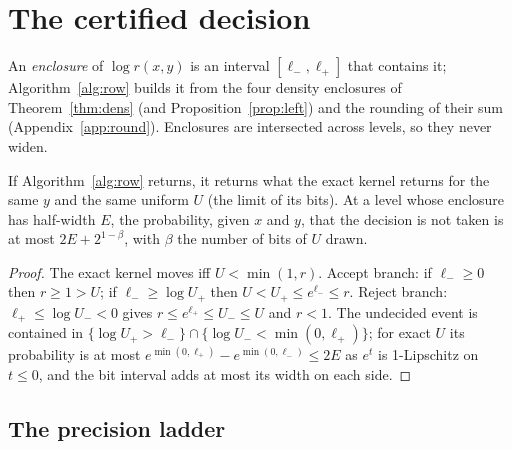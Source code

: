 \section{The certified decision}\label{sec:dec}

An \emph{enclosure} of $\log r(x,y)$ is an interval $[\ell_-,\ell_+]$ that contains it; Algorithm~\ref{alg:row}
builds it from the four density enclosures of Theorem~\ref{thm:dens} (and Proposition~\ref{prop:left}) and the
rounding of their sum (Appendix~\ref{app:round}). Enclosures are intersected across levels, so they never widen.

\begin{theorem}\label{thm:dec}
If Algorithm~\ref{alg:row} returns, it returns what the exact kernel returns for the same $y$ and the same
uniform $U$ (the limit of its bits). At a level whose enclosure has half-width $E$, the probability, given $x$
and $y$, that the decision is not taken is at most $2E+2^{1-\beta}$, with $\beta$ the number of bits of $U$
drawn.
\end{theorem}
\begin{proof}
The exact kernel moves iff $U<\min(1,r)$. Accept branch: if $\ell_-\ge0$ then $r\ge1>U$; if $\ell_-\ge\log U_+$
then $U<U_+\le e^{\ell_-}\le r$. Reject branch: $\ell_+\le\log U_-<0$ gives $r\le e^{\ell_+}\le U_-\le U$ and
$r<1$. The undecided event is contained in $\{\log U_+>\ell_-\}\cap\{\log U_-<\min(0,\ell_+)\}$; for exact $U$ its
probability is at most $e^{\min(0,\ell_+)}-e^{\min(0,\ell_-)}\le2E$ as $e^t$ is 1-Lipschitz on $t\le0$, and the
bit interval adds at most its width on each side.
\end{proof}

\subsection{The precision ladder}\label{sec:ladder}

